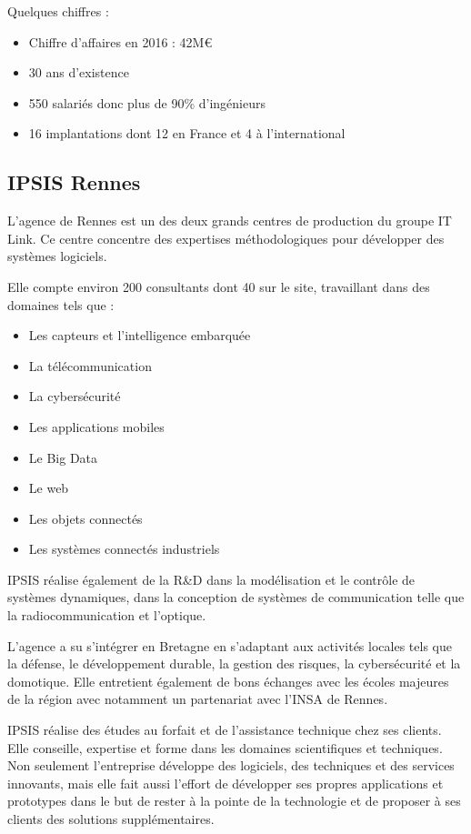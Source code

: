 \documentclass{article}
\begin{document}
Quelques chiffres :

\begin{itemize}
    \item Chiffre d'affaires en 2016 : 42M\euro{}
    \item 30 ans d'existence
    \item 550 salariés donc plus de 90\% d'ingénieurs
    \item 16 implantations dont 12 en France et 4 à l'international
\end{itemize}

\subsection{IPSIS Rennes}

L'agence de Rennes est un des deux grands centres de production du
groupe IT Link. Ce centre concentre des expertises méthodologiques pour
développer des systèmes logiciels.

Elle compte environ 200 consultants dont 40 sur le site, travaillant
dans des domaines tels que :
\begin{itemize}
    \item Les capteurs et l'intelligence embarquée
    \item La télécommunication
    \item La cybersécurité
    \item Les applications mobiles
    \item Le Big Data
    \item Le web
    \item Les objets connectés
    \item Les systèmes connectés industriels
\end{itemize}

IPSIS réalise également de la R\&D dans la modélisation et le contrôle
de systèmes dynamiques, dans la conception de systèmes de communication
telle que la radiocommunication et l'optique.

L'agence a su s'intégrer en Bretagne en s'adaptant aux activités locales
tels que la défense, le développement durable, la gestion des risques,
la cybersécurité et la domotique. Elle entretient également de bons
échanges avec les écoles majeures de la région avec notamment un
partenariat avec l'INSA de Rennes.

IPSIS réalise des études au forfait et de l'assistance technique chez
ses clients. Elle conseille, expertise et forme dans les domaines
scientifiques et techniques. Non seulement l'entreprise développe des
logiciels, des techniques et des services innovants, mais elle fait
aussi l'effort de développer ses propres applications et prototypes dans
le but de rester à la pointe de la technologie et de proposer à ses
clients des solutions supplémentaires.
\end{document}
